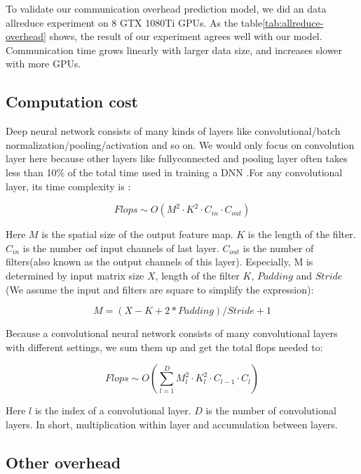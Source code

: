 To validate our communication overhead prediction model, we did an data allreduce experiment on 8 GTX 1080Ti GPUs. As the table\ref{tab:allreduce-overhead} shows, the result of our experiment agrees well with our model. Communication time grows linearly with larger data size, and increases slower with more GPUs.



\subsection{Computation cost}

Deep neural network consists of many kinds of layers like convolutional/batch normalization/pooling/activation and so on. We would only focus on convolution layer here because other layers like fullyconnected and pooling layer often takes less than 10\% of the total time used in training a DNN .For any convolutional layer, its time complexity is :

\begin{equation}
    Flops \sim O(M^2 \cdot K^2 \cdot C_{in} \cdot C_{out})
\end{equation}

Here $M$ is the spatial size of the output feature map. $K$ is the length of the filter. $C_{in}$ is the number osf input channels of last layer. $C_{out}$ is the number of filters(also known as the output channels of this layer). Especially, M is determined by input matrix size $X$, length of the filter $K$, $Padding$ and $Stride$ (We assume the input and filters are square to simplify the expression):

\begin{equation}
    M = (X - K + 2 * Padding) / Stride + 1
\end{equation}

Because a convolutional neural network consists of many convolutional layers with different settings, we sum them up and get the total flops needed to:

\begin{equation}
    Flops \sim O(\sum_{l=1}^{D} M_{l}^{2} \cdot K_{l}^{2} \cdot C_{l-1} \cdot C_{l})
\end{equation}

Here $l$ is the index of a convolutional layer. $D$ is the number of convolutional layers\cite{kaiming-cnn-constrained-time}. In short, multiplication within layer and accumulation between layers. 

\subsection{Other overhead}

